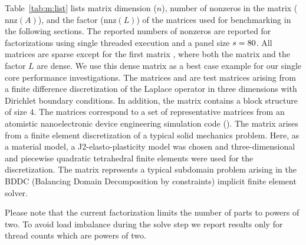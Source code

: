 Table~\ref{tab:m:list} lists matrix dimension ($n$), number of nonzeros in the
matrix ($\text{nnz}(A)$), and the factor (nnz$(L)$) of the matrices used for
benchmarking in the following sections.
The reported numbers of nonzeros 
are reported for factorizations using single threaded execution
and a panel size $s = 80$. 
All matrices are sparse except 
for the first matrix , where both the matrix and  
the factor $L$ are dense. 
We use this dense matrix as a best case example for our single core performance
investigations.
The matrices  and  are test matrices arising from a
finite difference discretization of the Laplace operator in three dimensions
with Dirichlet boundary conditions. 
In addition, the matrix  contains a block structure
of size $4$. 
The  matrices correspond to a set of representative matrices from 
an atomistic nanoelectronic device engineering simulation code (\cite{luisier2011atomistic}).
The matrix  arises from a finite element discretization of a typical
solid mechanics problem. Here, as a material model, a J2-elasto-plasticity model
was chosen and three-dimensional and piecewise quadratic tetrahedral finite
elements were used for the discretization. The matrix  represents a
typical subdomain problem arising in the BDDC (Balancing Domain Decomposition by
constraints) implicit finite element solver.


Please note that the current factorization limits the number of parts to powers
of two.
To avoid load imbalance during the solve step we report results only for thread
counts which are powers of two.
%

